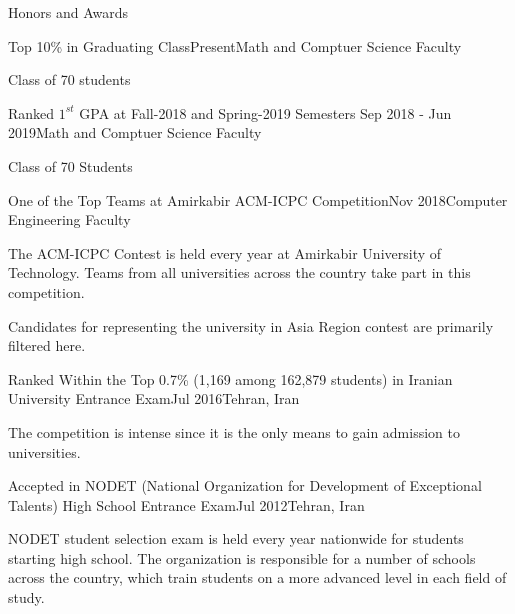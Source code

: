 \documentclass{resume} %
\begin{document}
	\begin{rSection}{Honors and Awards}
		\begin{rSubsection}{Top 10\% in Graduating Class}{Present}{Math and Comptuer Science Faculty}{ }
			\item Class of 70 students
		\end{rSubsection}
		
		\begin{rSubsection}{Ranked $1^{st}$ GPA at Fall-2018 and Spring-2019 Semesters }{Sep 2018 - Jun 2019}{Math and Comptuer Science Faculty}{ }
			\item Class of 70 Students
		\end{rSubsection}	
		
		\begin{rSubsection}{One of the Top Teams at Amirkabir ACM-ICPC Competition}{Nov 2018}{Computer Engineering Faculty}{ }
			\item The ACM-ICPC Contest is held every year at Amirkabir University of Technology. Teams from all universities across the country take part in this competition.
			\item Candidates for representing the university in Asia Region contest are primarily filtered here.
		\end{rSubsection}
		
		\begin{rSubsection}{Ranked Within the Top 0.7\% (1,169 among 162,879 students) in Iranian University Entrance Exam}{Jul 2016}{Tehran, Iran }{ }
			\item The competition is intense since it is the only means to gain admission to universities.
		\end{rSubsection} 
		
		\begin{rSubsection}{Accepted in NODET (National Organization for Development of Exceptional Talents) High School Entrance Exam}{Jul 2012}{Tehran, Iran }{ }
			\item NODET student selection exam is held every year nationwide for students starting high school. The organization is responsible for a number of schools across the country, which train students on a more advanced level in each field of study.
		\end{rSubsection}
		
	\end{rSection}
\end{document}
